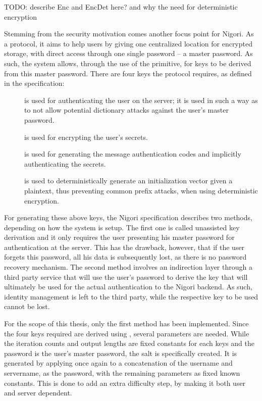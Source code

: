 TODO: describe Enc and EncDet here? and why the need for deterministic encryption

Stemming from the security motivation comes another focus point for Nigori.
As a protocol, it aims to help users by giving one centralized location for encrypted storage, with direct access through one single password -- a master password.
As such, the system allows, through the use of the  primitive, for keys to be derived from this master password.
There are four keys the protocol requires, as defined in the specification:
\begin{description}
  \item[] is used for authenticating the user on the server; it is used in such a way as to not allow potential dictionary attacks against the user's master password.
  \item[] is used for encrypting the user's secrets.
  \item[] is used for generating the message authentication codes and implicitly authenticating the secrets.
  \item[] is used to deterministically generate an initialization vector given a plaintext, thus preventing common prefix attacks, when using deterministic encryption.
\end{description}

For generating these above keys, the Nigori specification describes two methods, depending on how the system is setup.
The first one is called unassisted key derivation and it only requires the user presenting his master password for authentication at the server.
This has the drawback, however, that if the user forgets this password, all his data is subsequently lost, as there is no password recovery mechanism.
The second method involves an indirection layer through a third party service that will use the user's password to derive the key that will ultimately be used for the actual authentication to the Nigori backend.
As such, identity management is left to the third party, while the respective key to be used cannot be lost.

For the scope of this thesis, only the first method has been implemented.
Since the four keys required are derived using , several parameters are needed.
While the iteration counts and output lengths are fixed constants for each keys and the password is the user's master password, the salt is specifically created.
It is generated by applying  once again to a concatenation of the username and servername, as the password, with the remaining parameters as fixed known constants.
This is done to add an extra difficulty step, by making it both user and server dependent.

